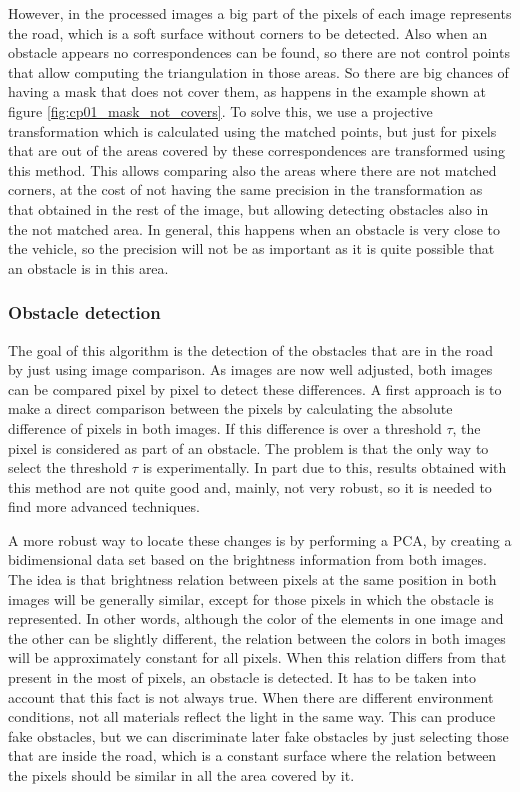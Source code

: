However, in the processed images a big part of the pixels of each image represents the road, which is a soft surface without corners to be detected. Also when an obstacle appears no correspondences can be found, so there are not control points that allow computing the triangulation in those areas. So there are big chances of having a mask that does not cover them, as happens in the example shown at figure \ref{fig:cp01_mask_not_covers}. To solve this, we use a projective transformation which is calculated using the matched points, but just for pixels that are out of the areas covered by these correspondences are transformed using this method. This allows comparing also the areas where there are not matched corners, at the cost of not having the same precision in the transformation as that obtained in the rest of the image, but allowing detecting obstacles also in the not matched area. In general, this happens when an obstacle is very close to the vehicle, so the precision will not be as important as it is quite possible that an obstacle is in this area.

\subsubsection{Obstacle detection}\label{ch:chapter01_01_03_02}

The goal of this algorithm is the detection of the obstacles that are in the road by just using image comparison. As images are now well adjusted, both images can be compared pixel by pixel to detect these differences. A first approach is to make a direct comparison between the pixels by calculating the absolute difference of pixels in both images. If this difference is over a threshold $\tau$, the pixel is considered as part of an obstacle. The problem is that the only way to select the threshold $\tau$ is experimentally. In part due to this, results obtained with this method are not quite good and, mainly, not very robust, so it is needed to find more advanced techniques.

A more robust way to locate these changes is by performing a \ac{PCA}, by creating a bidimensional data set based on the brightness information from both images. The idea is that brightness relation between pixels at the same position in both images will be generally similar, except for those pixels in which the obstacle is represented. In other words, although the color of the elements in one image and the other can be slightly different, the relation between the colors in both images will be approximately constant for all pixels. When this relation differs from that present in the most of pixels, an obstacle is detected. It has to be taken into account that this fact is not always true. When there are different environment conditions, not all materials reflect the light in the same way. This can produce fake obstacles, but we can discriminate later fake obstacles by just selecting those that are inside the road, which is a constant surface where the relation between the pixels should be similar in all the area covered by it.

